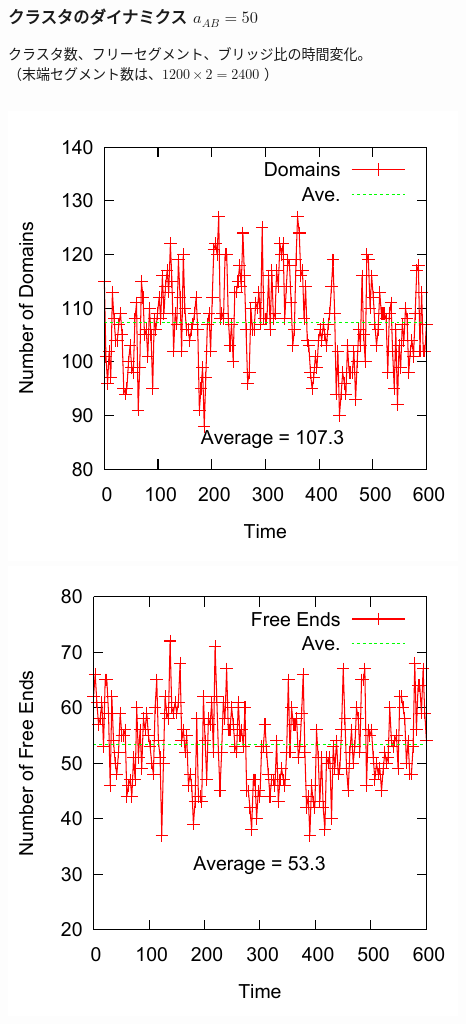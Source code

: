 \documentclass[12pt, dvipdfmx]{beamer}
\begin{document}
\begin{frame}
\frametitle{クラスタのダイナミクス $a_{AB}=50$}
クラスタ数、フリーセグメント、ブリッジ比の時間変化。\\
（末端セグメント数は、$1200\times2 = 2400$
）
\begin{columns}[T, totalwidth=\linewidth]
		\includegraphics[width=\columnwidth]{./fig/AB50/Domains.pdf}
		\includegraphics[width=\columnwidth]{./fig/AB50/Free_Ends.pdf}

\end{columns}
\end{frame}
\end{document}
